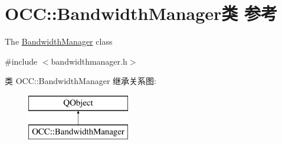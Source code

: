 \hypertarget{class_o_c_c_1_1_bandwidth_manager}{}\section{O\+CC\+:\+:Bandwidth\+Manager类 参考}
\label{class_o_c_c_1_1_bandwidth_manager}


The \hyperlink{class_o_c_c_1_1_bandwidth_manager}{Bandwidth\+Manager} class  




{\ttfamily \#include $<$bandwidthmanager.\+h$>$}

类 O\+CC\+:\+:Bandwidth\+Manager 继承关系图\+:\begin{figure}[H]
\begin{center}
\leavevmode
\includegraphics[height=2.000000cm]{class_o_c_c_1_1_bandwidth_manager}
\end{center}
\end{figure}
